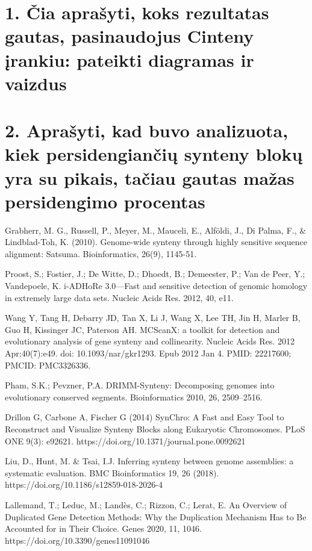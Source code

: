 \documentclass[12pt]{article}
\begin{document}
\newpage

\section*{1. Čia aprašyti, koks rezultatas gautas, pasinaudojus
Cinteny įrankiu: pateikti diagramas ir vaizdus}

\section*{2. Aprašyti, kad buvo analizuota, kiek persidengiančių synteny blokų
yra su pikais, tačiau gautas mažas persidengimo procentas}


\newpage


\begin{thebibliography}{99}

 Grabherr, M. G., Russell, P., Meyer, M., Mauceli,
E., Alföldi, J., Di Palma, F., \& Lindblad-Toh, K. (2010). Genome-wide
synteny through highly sensitive sequence alignment: Satsuma.
Bioinformatics, 26(9), 1145-51.

 Proost, S.; Fostier, J.; De Witte, D.; Dhoedt, B.;
Demeester, P.; Van de Peer, Y.; Vandepoele, K. i-ADHoRe 3.0—Fast and sensitive
detection of genomic homology in extremely large data sets. Nucleic Acids Res.
2012, 40, e11.

 Wang Y, Tang H, Debarry JD, Tan X, Li J, Wang X, Lee TH,
Jin H, Marler B, Guo H, Kissinger JC, Paterson AH. MCScanX: a toolkit for
detection and evolutionary analysis of gene synteny and collinearity. Nucleic
Acids Res. 2012 Apr;40(7):e49. doi: 10.1093/nar/gkr1293. Epub 2012 Jan 4.
PMID: 22217600; PMCID: PMC3326336.

 Pham, S.K.; Pevzner, P.A. DRIMM-Synteny: Decomposing
genomes into evolutionary conserved segments. Bioinformatics 2010, 26,
2509–2516.

 Drillon G, Carbone A, Fischer G (2014) SynChro: A Fast and
Easy Tool to Reconstruct and Visualize Synteny Blocks along Eukaryotic
Chromosomes. PLoS ONE 9(3): e92621. https://doi.org/10.1371/journal.pone.0092621

 Liu, D., Hunt, M. \& Tsai, I.J. Inferring synteny between
genome assemblies: a systematic evaluation. BMC Bioinformatics 19, 26 (2018).
https://doi.org/10.1186/s12859-018-2026-4

 Lallemand, T.; Leduc, M.; Landès, C.; Rizzon, C.; Lerat, E.
An Overview of Duplicated Gene Detection Methods: Why the Duplication Mechanism
Has to Be Accounted for in Their Choice. Genes 2020, 11, 1046.
https://doi.org/10.3390/genes11091046

\end{thebibliography}
\end{document}
